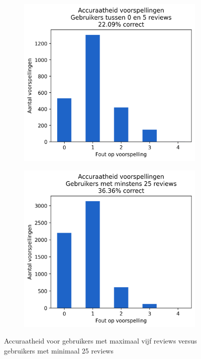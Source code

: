 \begin{figure}[H]
    \begin{subfigure}{.45\textwidth}
        \centering
        \includegraphics[width=1\linewidth]{fig/chapt5/predictor/accuracy_0_5.png}
    \end{subfigure}
    \begin{subfigure}{.45\textwidth}
        \centering
        \includegraphics[width=1\linewidth]{fig/chapt5/predictor/accuracy_25+.png}
    \end{subfigure}
    \caption{Accuraatheid voor gebruikers met maximaal vijf reviews versus gebruikers met minimaal 25 reviews}
    \label{fig:chapt5_accuracy_coldstart}
\end{figure}

